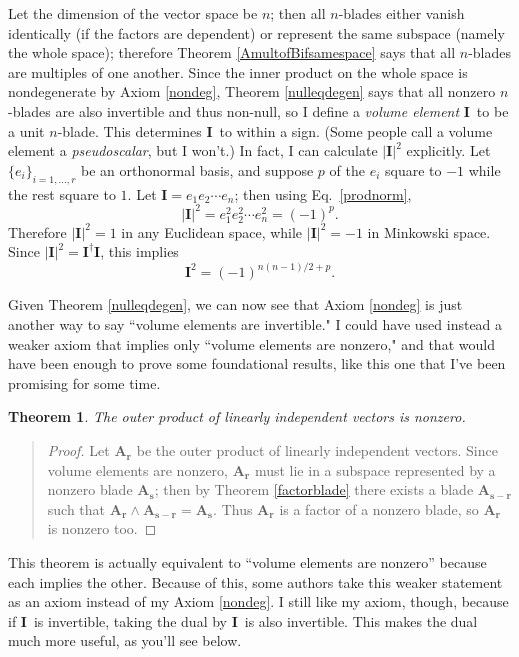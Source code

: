 \documentclass{utarticle}
\newcommand{\bl}[1]{\ensuremath{\bm{#1}}}
\newcommand{\I}{\bl{I}}
\DeclareMathOperator{\out}{\wedge}
\newcommand{\rev}[1]{\ensuremath{#1^\dagger}}
\newtheorem{thm}{Theorem}
\newcommand{\bp}{\begin{quotation} \begin{proof}}
\newcommand{\ep}{\end{proof} \end{quotation}}
\begin{document}
Let the dimension of the vector space be $n$; then all $n$-blades either vanish identically
(if the factors are dependent) or represent the same subspace (namely the whole space);
therefore Theorem \ref{AmultofBifsamespace} says that all $n$-blades are multiples of one 
another.  Since the inner product on the whole space is nondegenerate by Axiom \ref{nondeg}, 
Theorem \ref{nulleqdegen} says that all nonzero $n$-blades are also invertible and thus 
non-null, so I define a \emph{volume element} \I\ to be a unit $n$-blade.  This determines \I\ 
to within a sign.  (Some people call a volume element a \emph{pseudoscalar}, but I won't.)  
In fact, I can calculate $|\I|^2$ explicitly.  Let $\{e_i\}_{i=1,\dotsc,r}$ be an orthonormal basis,
and suppose $p$ of the $e_i$ square to $-1$ while the rest square to $1$.  Let $\I = 
e_1 e_2 \dotsb e_n$; then using Eq.~\eqref{prodnorm}, 
\begin{equation} |\I|^2 = e_1^2 e_2^2 \dotsb e_n^2 = (-1)^p. \label{Inormsq} \end{equation}
Therefore $|\I|^2 = 1$ in any Euclidean space, while $|\I|^2 = -1$ in Minkowski space.
Since $|\I|^2 = \rev{\I}\I$, this implies
\begin{equation} \I^2 = (-1)^{n(n-1)/2 + p}. \label{Isq} \end{equation}

Given Theorem \ref{nulleqdegen}, we can now see that Axiom \ref{nondeg} is just 
another way to say ``volume elements are invertible."  I could have used instead a weaker 
axiom that implies only ``volume elements are nonzero," and that would have
been enough to prove some foundational results, like this one that I've been promising for 
some time.
\begin{thm}
The outer product of linearly independent vectors is nonzero.  
\label{indepnonzero}
\end{thm}
\bp
Let \bl{A_r} be the outer product of linearly independent vectors.  Since volume elements are 
nonzero, \bl{A_r} must lie in a subspace represented by a nonzero blade \bl{A_s}; then by 
Theorem \ref{factorblade} there exists a blade \bl{A_{s-r}} such that $\bl{A_r} \out \bl{A_{s-r}} = 
\bl{A_s}$.  Thus \bl{A_r} is a factor of a nonzero blade, so \bl{A_r} is nonzero too.
\ep
This theorem is actually equivalent to ``volume elements are nonzero'' because each implies
the other.  Because of this, some authors take this weaker statement as an axiom instead of 
my Axiom \ref{nondeg}.  I still like my axiom, though, because if \I\ is invertible, taking the dual 
by \I\ is also invertible.  This makes the dual much more useful, as you'll see below.
\end{document}
